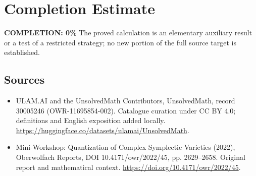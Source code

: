 \documentclass[11pt]{article}
\begin{document}
\section{Completion Estimate}
\noindent\textbf{COMPLETION: 0\%}
The proved calculation is an elementary auxiliary result or a test of a restricted strategy; no new portion of the full source target is established.

\subsection{Sources}
\begin{itemize}
\item[\hypertarget{source:30005246:1}{S1}] ULAM.AI and the UnsolvedMath Contributors, UnsolvedMath, record 30005246 (OWR-11695854-002). Catalogue curation under CC BY 4.0; definitions and English exposition added locally.
\url{https://huggingface.co/datasets/ulamai/UnsolvedMath}.
\item[\hypertarget{source:30005246:2}{S2}] Mini-Workshop: Quantization of Complex Symplectic Varieties (2022), Oberwolfach Reports, DOI 10.4171/owr/2022/45, pp. 2629--2658. Original report and mathematical context.
\url{https://doi.org/10.4171/owr/2022/45}.
\end{itemize}
\label{end:30005246}
\end{document}
